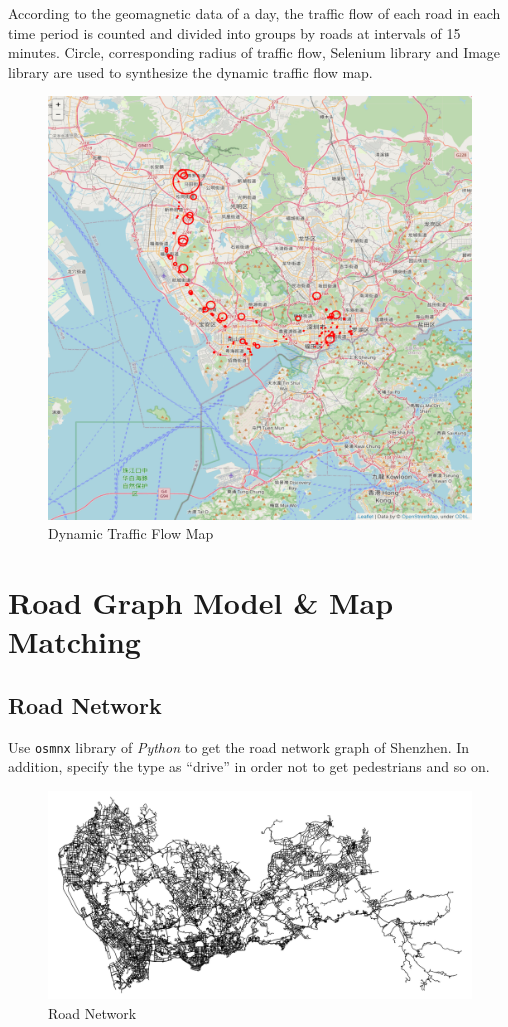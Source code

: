 \documentclass[fontset=none]{ctexart}
\theoremstyle{definition}
\theoremstyle{remark}
\begin{document}
According to the geomagnetic data of a day, the traffic flow of each road in each time period is counted and divided into groups by roads at intervals of 15 minutes. Circle, corresponding radius of traffic flow, Selenium library and Image library are used to synthesize the dynamic traffic flow map.
\begin{figure}[htb]
  \centering
  \includegraphics[width=\textwidth]{images/7-3-7/f5ef9dc31d044acac988911ed92b0494EgYhqvGPburiSExo-22.png}
  \caption{Dynamic Traffic Flow Map}
  \label{fig: 737}
\end{figure}

\clearpage
\section{Road Graph Model \& Map Matching}
\subsection{Road Network}
Use \texttt{osmnx} library of \textit{Python} to get the road network graph of Shenzhen.
In addition, specify the type as ``drive'' in order not to get pedestrians and so on.

\begin{figure}[htb]
  \centering
  \includegraphics[width=\textwidth]{images/7-4-1.png}
  \caption{Road Network}
  \label{fig: rn}
\end{figure}
\end{document}
